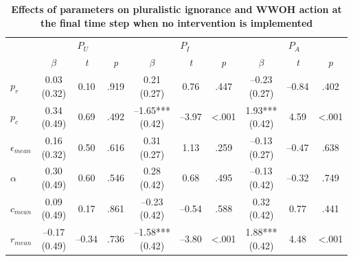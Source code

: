 \documentclass[
  11pt,
]{article}
\begin{document}
\begin{table}
\caption{\textbf{Effects of parameters on pluralistic ignorance and WWOH action at the final time step when no intervention is implemented}}
\centering
\begin{threeparttable}

\begin{tabular}[t]{>{\raggedright\arraybackslash}p{0.5in}ccccccccc}
\toprule
\multicolumn{1}{c}{ } & \multicolumn{3}{c}{$P_U$} & \multicolumn{3}{c}{$P_I$} & \multicolumn{3}{c}{$P_A$} \\
\cmidrule(l{3pt}r{3pt}){2-4} \cmidrule(l{3pt}r{3pt}){5-7} \cmidrule(l{3pt}r{3pt}){8-10}
\multicolumn{1}{c}{\em{ }} & \multicolumn{1}{c}{$\beta$} & \multicolumn{1}{c}{\em{t}} & \multicolumn{1}{c}{\em{p}} & \multicolumn{1}{c}{$\beta$} & \multicolumn{1}{c}{\em{t}} & \multicolumn{1}{c}{\em{p}} & \multicolumn{1}{c}{$\beta$} & \multicolumn{1}{c}{\em{t}} & \multicolumn{1}{c}{\em{p}}\\
\midrule
$p_r$ & \makecell[c]{0.03\\(0.32)} & 0.10 & .919 & \makecell[c]{0.21\\(0.27)} & 0.76 & .447 & \makecell[c]{–0.23\\(0.27)} & –0.84 & .402\\
$p_c$ & \makecell[c]{0.34\\(0.49)} & 0.69 & .492 & \makecell[c]{–1.65***\\(0.42)} & –3.97 & <.001 & \makecell[c]{1.93***\\(0.42)} & 4.59 & <.001\\
$\epsilon_{mean}$ & \makecell[c]{0.16\\(0.32)} & 0.50 & .616 & \makecell[c]{0.31\\(0.27)} & 1.13 & .259 & \makecell[c]{–0.13\\(0.27)} & –0.47 & .638\\
$\alpha$ & \makecell[c]{0.30\\(0.49)} & 0.60 & .546 & \makecell[c]{0.28\\(0.42)} & 0.68 & .495 & \makecell[c]{–0.13\\(0.42)} & –0.32 & .749\\
$c_{mean}$ & \makecell[c]{0.09\\(0.49)} & 0.17 & .861 & \makecell[c]{–0.23\\(0.42)} & –0.54 & .588 & \makecell[c]{0.32\\(0.42)} & 0.77 & .441\\
$r_{mean}$ & \makecell[c]{–0.17\\(0.49)} & –0.34 & .736 & \makecell[c]{–1.58***\\(0.42)} & –3.80 & <.001 & \makecell[c]{1.88***\\(0.42)} & 4.48 & <.001\\

\end{tabular}
\end{threeparttable}
\end{table}
\end{document}
